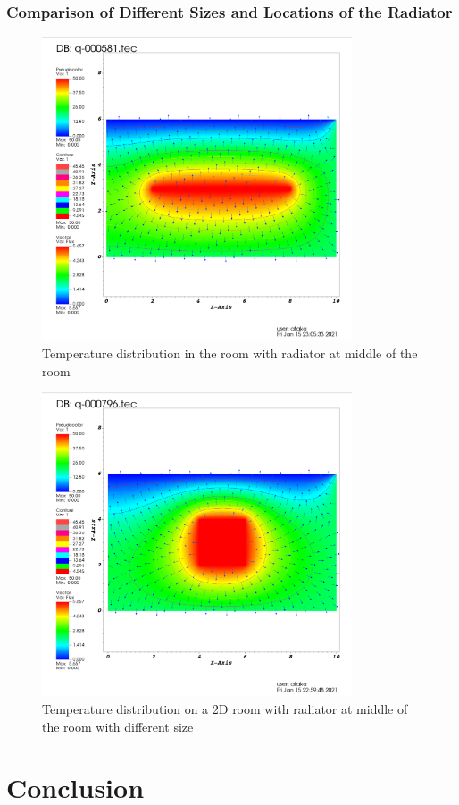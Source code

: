 \documentclass[letterpaper,12pt]{article}
\begin{document}
\subsubsection{Comparison of Different Sizes and Locations of the Radiator}
\begin{figure}[H] 
	\centering 
	\includegraphics[max height=9cm]{graphs/radiator_middle_long/radiator_middle_long.png}
	\caption{Temperature distribution in the room with radiator at middle of the room}
 	\label{fig:middle}
\end{figure}
\begin{figure}[H] 
	\centering 
	\includegraphics[max height=9cm]{graphs/radiator_middle/radiator_middle.png}
	\caption{Temperature distribution on a 2D room with radiator at middle of the room with different size}
 	\label{fig:middlelong}
\end{figure}

\section{Conclusion}
\end{document}
